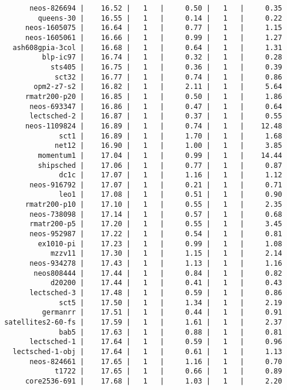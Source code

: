\begin{verbatim}
       neos-826694 |    16.52 |   1   |     0.50 |   1   |     0.35
         queens-30 |    16.55 |   1   |     0.14 |   1   |     0.22
      neos-1605075 |    16.64 |   1   |     0.77 |   1   |     1.15
      neos-1605061 |    16.66 |   1   |     0.99 |   1   |     1.27
   ash608gpia-3col |    16.68 |   1   |     0.64 |   1   |     1.31
          blp-ic97 |    16.74 |   1   |     0.32 |   1   |     0.28
            sts405 |    16.75 |   1   |     0.36 |   1   |     0.39
             sct32 |    16.77 |   1   |     0.74 |   1   |     0.86
        opm2-z7-s2 |    16.82 |   1   |     2.11 |   1   |     5.64
      rmatr200-p20 |    16.85 |   1   |     0.50 |   1   |     1.86
       neos-693347 |    16.86 |   1   |     0.47 |   1   |     0.64
       lectsched-2 |    16.87 |   1   |     0.37 |   1   |     0.55
      neos-1109824 |    16.89 |   1   |     0.74 |   1   |    12.48
              sct1 |    16.89 |   1   |     1.70 |   1   |     1.68
             net12 |    16.90 |   1   |     1.00 |   1   |     3.85
         momentum1 |    17.04 |   1   |     0.99 |   1   |    14.44
         shipsched |    17.06 |   1   |     0.77 |   1   |     0.87
              dc1c |    17.07 |   1   |     1.16 |   1   |     1.12
       neos-916792 |    17.07 |   1   |     0.21 |   1   |     0.71
              leo1 |    17.08 |   1   |     0.51 |   1   |     0.90
      rmatr200-p10 |    17.10 |   1   |     0.55 |   1   |     2.35
       neos-738098 |    17.14 |   1   |     0.57 |   1   |     0.68
       rmatr200-p5 |    17.20 |   1   |     0.55 |   1   |     3.45
       neos-952987 |    17.22 |   1   |     0.54 |   1   |     0.81
         ex1010-pi |    17.23 |   1   |     0.99 |   1   |     1.08
            mzzv11 |    17.30 |   1   |     1.15 |   1   |     2.14
       neos-934278 |    17.43 |   1   |     1.13 |   1   |     1.16
        neos808444 |    17.44 |   1   |     0.84 |   1   |     0.82
            d20200 |    17.44 |   1   |     0.41 |   1   |     0.43
       lectsched-3 |    17.48 |   1   |     0.59 |   1   |     0.86
              sct5 |    17.50 |   1   |     1.34 |   1   |     2.19
          germanrr |    17.51 |   1   |     0.44 |   1   |     0.91
 satellites2-60-fs |    17.59 |   1   |     1.61 |   1   |     2.37
              bab5 |    17.63 |   1   |     0.88 |   1   |     0.81
       lectsched-1 |    17.64 |   1   |     0.59 |   1   |     0.96
   lectsched-1-obj |    17.64 |   1   |     0.61 |   1   |     1.13
       neos-824661 |    17.65 |   1   |     1.16 |   1   |     0.70
             t1722 |    17.65 |   1   |     0.66 |   1   |     0.89
      core2536-691 |    17.68 |   1   |     1.03 |   1   |     2.20

\end{verbatim}
